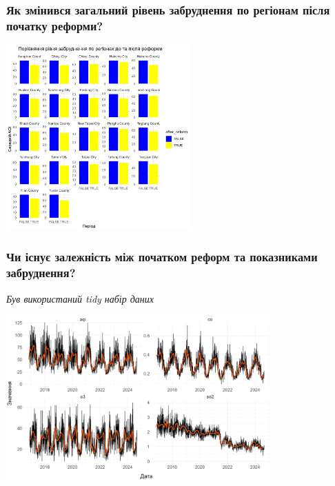 \documentclass{beamer}
\begin{document}
\begin{frame}
  \frametitle{Як змінився загальний рівень забруднення по регіонам після початку реформи?}

  \begin{center}
    \includegraphics[height=2.8in]{plots/question5/region_comparison_aqi.png}
  \end{center}
\end{frame}


\begin{frame}
  \frametitle{Чи існує залежність між початком реформ та показниками забруднення?}

  \textit{Був використаний tidy набір даних}

  \begin{center}
    \includegraphics[height=2.5in]{plots/question6/line-p1.png}
  \end{center}
\end{frame}
\end{document}
